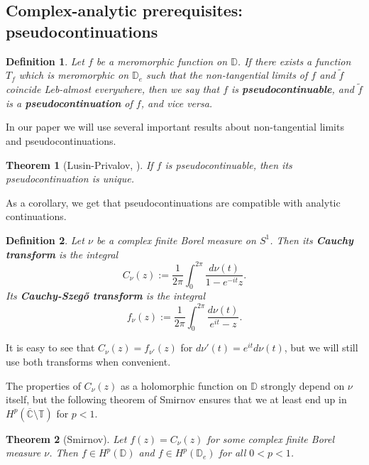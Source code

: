 \documentclass[11pt]{article}
\newtheorem{definition}{Definition}[section]
\newtheorem{theorem}{Theorem}[section]
\begin{document}
\subsection{Complex-analytic prerequisites: pseudocontinuations}

\begin{definition}
	Let $f$ be a meromorphic function on $\mathbb{D}$. If there exists a function $T_f$ which is meromorphic on $\mathbb{D}_e$ such that the non-tangential limits of $f$ and $\tilde{f}$ coincide Leb-almost everywhere, then we say that $f$ is \textbf{pseudocontinuable}, and $\tilde{f}$ is a \textbf{pseudocontinuation} of $f$, and vice versa.
\end{definition}

In our paper we will use several important results about non-tangential limits and pseudocontinuations.

\begin{theorem}[Lusin-Privalov, \cite{privalov1956randeigenschaften}]
	If $f$ is pseudocontinuable, then its pseudocontinuation is unique.
\end{theorem}

As a corollary, we get that pseudocontinuations are compatible with analytic continuations.

\begin{definition}
	Let $\nu$ be a complex finite Borel measure on $S^1$. Then its \textbf{Cauchy transform} is the integral
	\begin{equation}
		C_\nu(z) := \frac{1}{2\pi} \int_0^{2 \pi} \dfrac{d \nu(t)}{1 - e^{-it} z}.
	\end{equation}
	Its \textbf{Cauchy-Szeg\H{o} transform} is the integral
	\begin{equation}
		f_\nu(z) := \frac{1}{2\pi} \int_0^{2 \pi} \dfrac{d \nu(t)}{e^{it} - z}.
	\end{equation}
\end{definition}

It is easy to see that $C_\nu(z) = f_{\nu'}(z)$ for $d \nu'(t) = e^{it} d \nu(t)$, but we will still use both transforms when convenient.

The properties of $C_\nu(z)$ as a holomorphic function on $\mathbb{D}$ strongly depend on $\nu$ itself, but the following theorem of Smirnov ensures that we at least end up in $H^p(\overline{\mathbb{C}}  \setminus \mathbb{T})$ for $p < 1$.

\begin{theorem}[Smirnov]
	\label{T:Smirnov}
	Let $f(z) = C_\nu(z)$ for some complex finite Borel measure $\nu$. Then $f \in H^p(\mathbb{D})$ and $f \in H^p(\mathbb{D}_e)$ for all $0 < p < 1$.
\end{theorem}
\end{document}
